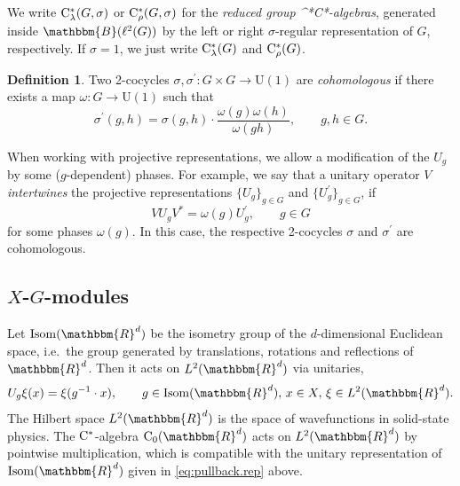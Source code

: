 \documentclass{amsart}
\numberwithin{figure}{section}
\numberwithin{equation}{section}
\numberwithin{table}{section}
\theoremstyle{plain}
\theoremstyle{definition}
\newtheorem{definition}[equation]{Definition}
\theoremstyle{remark}
\theoremstyle{nonumber}
\newcommand{\R}{\mathbb{R}}
\newcommand{\Bdd}{\mathbb{B}}
\newcommand{\Cst}{\relax\ifmmode\mathrm{C}^*\else\textup{C*}\fi}
\newcommand{\Co}{\mathrm{C}_0}
\newcommand{\Cstl}{\Cst_\lambda} %
\newcommand{\Cstr}{\Cst_\rho} %
\newcommand{\Isom}{\mathrm{Isom}}
\renewcommand{\mathbb}{\mathbbm} %
\begin{document}
We write \( \Cstl(G,\sigma) \) or \( \Cstr(G,\sigma) \) for the \emph{reduced group
\Cst-algebras}, generated inside $\Bdd(\ell^2(G))$ by the left or right $\sigma$-regular
representation of \( G \), respectively. If $\sigma= 1$, we just write $\Cstl(G)$ and $\Cstr(G)$.

\begin{definition}\label{dfn:cohomologous_cocycles}
Two 2-cocycles $\sigma,\sigma^\prime\colon G\times G\to\mathrm{U}(1)$ are
\emph{cohomologous} if there exists a map $\omega\colon G\to \mathrm{U}(1)$ such that 
\begin{equation}\label{eq:cohomologous_cocycles}
\sigma^\prime(g,h)=\sigma(g,h)\cdot\frac{\omega(g)\omega(h)}{\omega(gh)},\qquad g, h\in G.
\end{equation}
\end{definition}
When working with projective representations, we allow a modification of the $U_g$ by some ($g$-dependent) phases. For example, we say that a unitary operator $V$ \emph{intertwines} the projective representations $\{U_g\}_{g\in G}$ and $\{U^\prime_g\}_{g\in G}$, if
\begin{equation}\label{eq:projective_intertwine}
VU_gV^*=\omega(g)U^\prime_g,\qquad g\in G
\end{equation}
for some phases $\omega(g)$. In this case, the respective 2-cocycles $\sigma$ and $\sigma^\prime$ are cohomologous.

\subsection{$X$-$G$-modules}\label{sec:XG.module}
Let \( \Isom(\R^d) \) be the isometry group of the \( d
\)-dimensional Euclidean space, i.e.~the group generated by translations,
rotations and reflections of \( \R^d \). Then it acts on \( L^2(\R^d) \)
via unitaries,
\begin{equation}\label{eq:pullback.rep} 
U_g\xi(x)=\xi(g^{-1}\cdot
x),\qquad g\in \Isom(\R^d),\, x\in X,\, \xi\in L^2(\R^d).  
\end{equation}
The Hilbert space \( L^2(\R^d) \) is the space of wavefunctions in solid-state physics.
The $\Cst$-algebra $\Co(\R^d)$ acts on \( L^2(\R^d) \) by pointwise multiplication,
which is compatible with the unitary representation of \(
\Isom(\R^d) \) given in \eqref{eq:pullback.rep} above.
\end{document}
